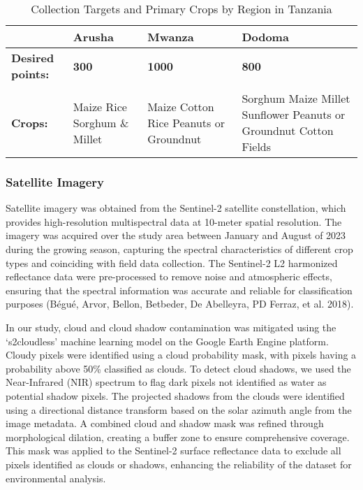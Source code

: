 \documentclass[
]{article}
\begin{document}
\begin{table}[h!]
\centering
\begin{tabular}{@{}lp{4cm}p{4cm}p{4cm}@{}}
\toprule
& \textbf{Arusha} & \textbf{Mwanza} & \textbf{Dodoma} \\ \midrule
\textbf{Desired points:} & \textbf{300} & \textbf{1000} & \textbf{800} \\ 
\midrule \\
\textbf{Crops:} & Maize \newline Rice \newline Sorghum \& Millet 
               & Maize \newline Cotton \newline Rice \newline Peanuts or Groundnut 
               & Sorghum \newline Maize \newline Millet \newline Sunflower \newline Peanuts or Groundnut \newline Cotton Fields \\ 
\bottomrule
\end{tabular}
\caption{Collection Targets and Primary Crops by Region in Tanzania}
\label{tab:data_n}
\end{table}

\hypertarget{satellite-imagery}{%
\subsubsection{Satellite Imagery}\label{satellite-imagery}}

Satellite imagery was obtained from the Sentinel-2 satellite
constellation, which provides high-resolution multispectral data at
10-meter spatial resolution. The imagery was acquired over the study
area between January and August of 2023 during the growing season,
capturing the spectral characteristics of different crop types and
coinciding with field data collection. The Sentinel-2 L2 harmonized
reflectance data were pre-processed to remove noise and atmospheric
effects, ensuring that the spectral information was accurate and
reliable for classification purposes (Bégué, Arvor, Bellon, Betbeder, De
Abelleyra, PD Ferraz, et al. 2018).

In our study, cloud and cloud shadow contamination was mitigated using
the `s2cloudless' machine learning model on the Google Earth Engine
platform. Cloudy pixels were identified using a cloud probability mask,
with pixels having a probability above 50\% classified as clouds. To
detect cloud shadows, we used the Near-Infrared (NIR) spectrum to flag
dark pixels not identified as water as potential shadow pixels. The
projected shadows from the clouds were identified using a directional
distance transform based on the solar azimuth angle from the image
metadata. A combined cloud and shadow mask was refined through
morphological dilation, creating a buffer zone to ensure comprehensive
coverage. This mask was applied to the Sentinel-2 surface reflectance
data to exclude all pixels identified as clouds or shadows, enhancing
the reliability of the dataset for environmental analysis.
\end{document}
